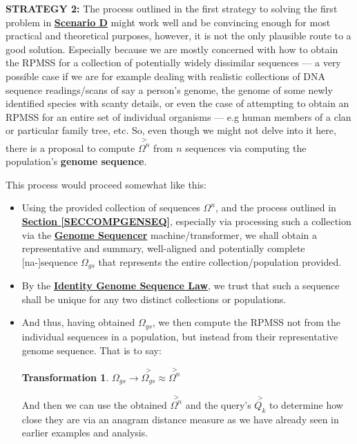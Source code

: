 \documentclass[a4paper, 18pt]{book} %
\newtheorem{trans}{Transformation}
\begin{document}
\textbf{STRATEGY 2:} The process outlined in the first strategy to solving the first problem in \textbf{\hyperref[SECSCEND]{Scenario D}} might work well and be convincing enough for most practical and theoretical purposes, however, it is not the only plausible route to a good solution. Especially because we are mostly concerned with how to obtain the RPMSS for a collection of potentially widely dissimilar sequences --- a very possible case if we are for example dealing with realistic collections of DNA sequence readings/scans of say a person's genome, the genome of some newly identified species with scanty details, or even the case of attempting to obtain an RPMSS for an entire set of individual organisms --- e.g human members of a clan or particular family tree, etc. So, even though we might not delve into it here, there is a proposal to compute $\overset{>}{\Omega^n}$ from $n$ sequences via computing the population's \textbf{genome sequence}. 

This process would proceed somewhat like this:

\begin{itemize}
\item Using the provided collection of sequences $\Omega^n$, and the process outlined in \textbf{\hyperref[SECCOMPGENSEQ]{Section \ref{SECCOMPGENSEQ}}}, especially via processing such a collection via the \textbf{\hyperref[DEFGENOMESEQ]{Genome Sequencer}} machine/transformer, we shall obtain a representative and summary, well-aligned and potentially complete [na-]sequence $\Omega_{gs}$ that represents the entire collection/population provided.
\item By the \textbf{\hyperref[LAWGDL]{Identity Genome Sequence Law}}, we trust that such a sequence shall be unique for any two distinct collections or populations.
\item {And thus, having obtained $\Omega_{gs}$, we then compute the RPMSS not from the individual sequences in a population, but instead from their representative genome sequence. That is to say:

\begin{trans}
\label{RPMSSFROMGS}
$\Omega_{gs} \rightarrow \overset{>}{\Omega_{gs}} \approx \overset{>}{\Omega^n}$
\end{trans}

And then we can use the obtained $\overset{>}{\Omega^n}$ and the query's $\overset{>}{Q_k}$ to determine how close they are via an anagram distance measure as we have already seen in earlier examples and analysis.
}
\end{itemize}
\end{document}
